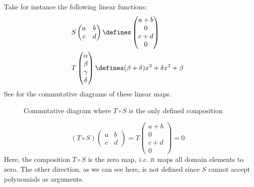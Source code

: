 \begin{exm}\label{exm-linear-composition:2}
	Take for instance the following linear functions:
	\begin{align*}
		 & S\begin{pmatrix}
			a & b \\
			c & d
		\end{pmatrix}\defines\begin{pmatrix}
			a+b \\
			0   \\
			c+d \\
			0
		\end{pmatrix}            \\
		 & T\begin{pmatrix}
			\alpha \\
			\beta  \\
			\gamma \\
			\delta
		\end{pmatrix}\defines(\beta+\delta)x^3 + \delta x^2 + \beta
	\end{align*}
	See  for the commutative
	diagrams of these linear maps.
	\begin{figure}[ht!]
		\centering
		\caption{Commutative diagram where $T \circ S$ is the only defined composition}
		\label{commutative-diagram:linear-composition:2}
	\end{figure}
	\begin{equation*}
		(T \circ S)\begin{pmatrix}
			a & b \\
			c & d
		\end{pmatrix}=T\begin{pmatrix}
			a+b \\
			0   \\
			c+d \\
			0
		\end{pmatrix}=0
	\end{equation*}
	Here, the composition $T \circ S$ is the zero map, \textit{i.e.} it maps all
	domain elements to zero. The other direction, as we can see here, is not defined
	since $S$ cannot accept polynomials as arguments.
\end{exm}

